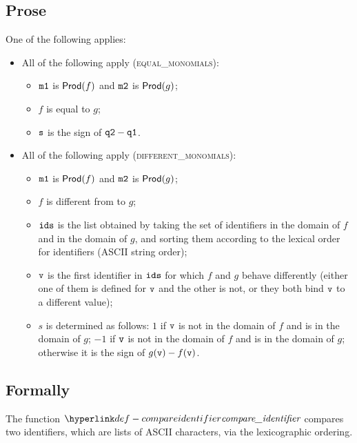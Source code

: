 \subsection{Prose}
One of the following applies:
\begin{itemize}
  \item All of the following apply (\textsc{equal\_monomials}):
  \begin{itemize}
    \item $\texttt{m1}$ is $\textsf{Prod}(f)$ and $\texttt{m2}$ is $\textsf{Prod}(g)$;
    \item $f$ is equal to $g$;
    \item $\texttt{s}$ is the sign of $\texttt{q2} - \texttt{q1}$.
  \end{itemize}

  \item All of the following apply (\textsc{different\_monomials}):
  \begin{itemize}
    \item $\texttt{m1}$ is $\textsf{Prod}(f)$ and $\texttt{m2}$ is $\textsf{Prod}(g)$;
    \item $f$ is different from to $g$;
    \item $\texttt{ids}$ is the list obtained by taking the set of identifiers in the domain of $f$ and in the domain of $g$,
          and sorting them according to the lexical order for identifiers (ASCII string order);
    \item $\texttt{v}$ is the first identifier in $\texttt{ids}$ for which $f$ and $g$ behave differently (either one of them is defined
          for $\texttt{v}$ and the other is not, or they both bind $\texttt{v}$ to a different value);
    \item $s$ is determined as follows: $1$ if $\texttt{v}$ is not in the domain of $f$ and is in the domain of $g$;
          $-1$ if $\texttt{v}$ is not in the domain of $f$ and is in the domain of $g$;
          otherwise it is the sign of $g(\texttt{v})-f(\texttt{v})$.
  \end{itemize}
\end{itemize}

\subsection{Formally}
\hypertarget{def-compareidentifier}{}
The function $\compareidentifier$ compares two identifiers, which are lists of ASCII characters,
via the lexicographic ordering.


